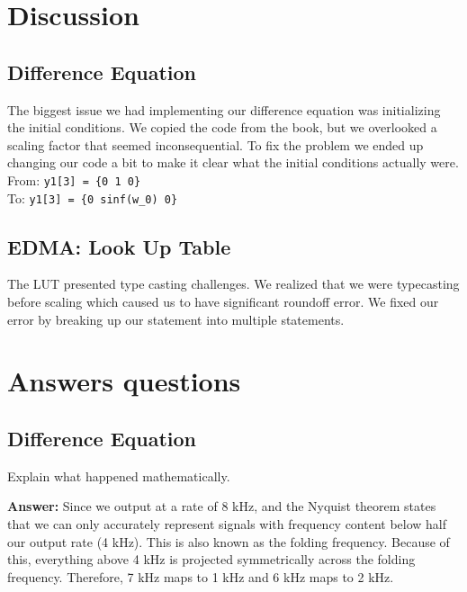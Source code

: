 \documentclass{article}
\begin{document}

\section{Discussion}

\subsection{Difference Equation}

The biggest issue we had implementing our difference equation was initializing the initial conditions.
We copied the code from the book, but we overlooked a scaling factor that seemed inconsequential.
To fix the problem we ended up changing our code a bit to make it clear what the initial conditions actually were. \\

From: \verb|y1[3] = {0 1 0}| \\
To: \verb|y1[3] = {0 sinf(w_0) 0}|

\subsection{EDMA: Look Up Table}

The LUT presented type casting challenges.
We realized that we were typecasting before scaling which caused us to have significant roundoff error.
We fixed our error by breaking up our statement into multiple statements.


\section{Answers questions}

\subsection{Difference Equation}

\begin{enumerate}
  \begin{item}
    Explain what happened mathematically.

  \textbf{Answer:}
    Since we output at a rate of 8 kHz, and the Nyquist theorem states that we can only accurately represent signals with frequency content below half our output rate (4 kHz).
    This is also known as the folding frequency. Because of this, everything above 4 kHz is projected symmetrically across the folding frequency. 
    Therefore, 7 kHz maps to 1 kHz and 6 kHz maps to 2 kHz.

  \end{item}
\end{enumerate}
\end{document}
